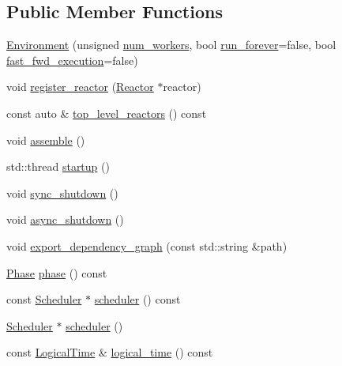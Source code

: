 \subsection*{Public Member Functions}
\begin{DoxyCompactItemize}
\item 
\hyperlink{classreactor_1_1Environment_add3e14bfed87d544bac849fced7f30f8}{Environment} (unsigned \hyperlink{classreactor_1_1Environment_a3348b53c1d45a315920832d7505f9057}{num\+\_\+workers}, bool \hyperlink{classreactor_1_1Environment_a7a83a769b141d23297912e7588eb4495}{run\+\_\+forever}=false, bool \hyperlink{classreactor_1_1Environment_a4f6e899d401fc1238143de9d725c247d}{fast\+\_\+fwd\+\_\+execution}=false)
\item 
void \hyperlink{classreactor_1_1Environment_afa74eb3e5dd5a7a4b1629f9dd63a168f}{register\+\_\+reactor} (\hyperlink{classreactor_1_1Reactor}{Reactor} $\ast$reactor)
\item 
const auto \& \hyperlink{classreactor_1_1Environment_a89de40b92defdcde2e090a6f244c1eab}{top\+\_\+level\+\_\+reactors} () const
\item 
void \hyperlink{classreactor_1_1Environment_afd2ce93dd4fae7a1c6c93a8a274bf618}{assemble} ()
\item 
std\+::thread \hyperlink{classreactor_1_1Environment_a978f39f3609ed3889db10961505a61d9}{startup} ()
\item 
void \hyperlink{classreactor_1_1Environment_a7bc165b2d7a3a6bc6c4573c26170dc50}{sync\+\_\+shutdown} ()
\item 
void \hyperlink{classreactor_1_1Environment_a78cc13dcc68f71867e967da1c7cca001}{async\+\_\+shutdown} ()
\item 
void \hyperlink{classreactor_1_1Environment_a5f80b554cf21643375ad1202c8aea85c}{export\+\_\+dependency\+\_\+graph} (const std\+::string \&path)
\item 
\hyperlink{classreactor_1_1Environment_a2f0bcf10490e174246fc14b456fb0755}{Phase} \hyperlink{classreactor_1_1Environment_ab0cc703268b97b54e0a9e0927f0738d4}{phase} () const
\item 
const \hyperlink{classreactor_1_1Scheduler}{Scheduler} $\ast$ \hyperlink{classreactor_1_1Environment_a2a4cf2150b314a18db041e8a06086904}{scheduler} () const
\item 
\hyperlink{classreactor_1_1Scheduler}{Scheduler} $\ast$ \hyperlink{classreactor_1_1Environment_a4ac32b7f7f9a420bb689d7f5c5ce48da}{scheduler} ()
\item 
const \hyperlink{classreactor_1_1LogicalTime}{Logical\+Time} \& \hyperlink{classreactor_1_1Environment_a09aa23da721fffd3bb0b62f879d167b0}{logical\+\_\+time} () const

\end{DoxyCompactItemize}
